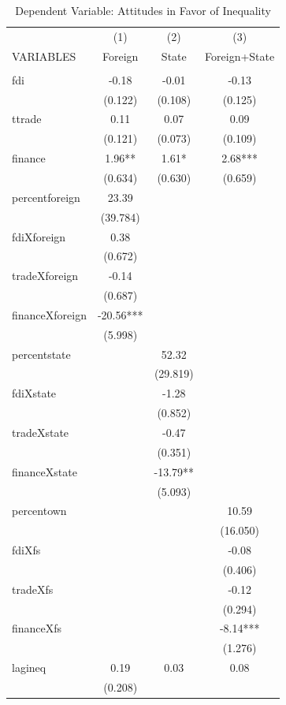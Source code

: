 \documentclass[12pt]{report}
\begin{document}
\begin{table}[htdp]
\caption{Dependent Variable: Attitudes in Favor of Inequality}
\vspace{2em}
\begin{center}
{\scriptsize
\begin{tabular}{lccc} \hline  & (1) & (2) & (3) \\ VARIABLES & Foreign &
State & Foreign+State \\ \hline  &  &
 &  \\ fdi & -0.18 &
-0.01 & -0.13 \\  & (0.122) &
(0.108) & (0.125) \\
ttrade & 0.11 & 0.07 & 0.09 \\  & (0.121) &
(0.073) & (0.109) \\
finance & 1.96** & 1.61* & 2.68*** \\  & (0.634) &
(0.630) & (0.659) \\
percentforeign & 23.39 &  &  \\  & (39.784) &
 &  \\ fdiXforeign &
0.38 &  &  \\  & (0.672) &
 &  \\ tradeXforeign &
-0.14 &  &  \\  & (0.687) &
 &  \\ financeXforeign &
-20.56*** &  &  \\  & (5.998) &
 &  \\ percentstate &  &
52.32 &  \\  &  &
(29.819) &  \\ fdiXstate
&  & -1.28 &  \\  &  &
(0.852) &  \\
tradeXstate &  & -0.47 &  \\  &  &
(0.351) &  \\
financeXstate &  & -13.79** &  \\  &  &
(5.093) &  \\ percentown
&  &  & 10.59 \\  &  &
 & (16.050) \\ fdiXfs &
&  & -0.08 \\  &  &
 & (0.406) \\ tradeXfs &
&  & -0.12 \\  &  &
 & (0.294) \\ financeXfs
&  &  & -8.14*** \\  &  &
 & (1.276) \\ lagineq &
0.19 & 0.03 & 0.08 \\  & (0.208) &

\end{tabular}}
\end{center}
\end{table}
\end{document}
